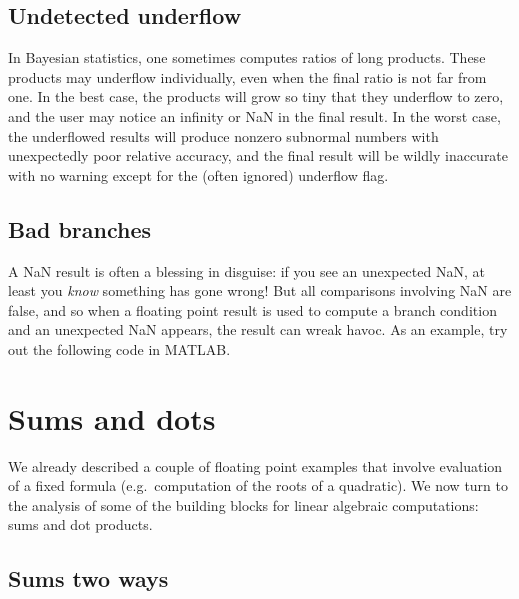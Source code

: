 \documentclass[12pt, leqno]{article} %
\begin{document}
\subsection{Undetected underflow}

In Bayesian statistics, one sometimes computes ratios of long
products.  These products may underflow individually, even when the
final ratio is not far from one.  In the best case, the products will
grow so tiny that they underflow to zero, and the user may notice an
infinity or NaN in the final result.  In the worst case, the
underflowed results will produce nonzero subnormal numbers with
unexpectedly poor relative accuracy, and the final result will be
wildly inaccurate with no warning except for the (often ignored)
underflow flag.

\subsection{Bad branches}

A NaN result is often a blessing in disguise: if you see an
unexpected NaN, at least you {\em know} something has gone wrong!
But all comparisons involving NaN are false,  and so
when a floating point result is used to compute a branch condition
and an unexpected NaN appears, the result can wreak havoc.
As an example, try out the following code in MATLAB.



\section{Sums and dots}

We already described a couple of floating point examples that
involve evaluation of a fixed formula (e.g.~computation of
the roots of a quadratic).  We now turn to the analysis of
some of the building blocks for linear algebraic computations:
sums and dot products.

\subsection{Sums two ways}
\end{document}
